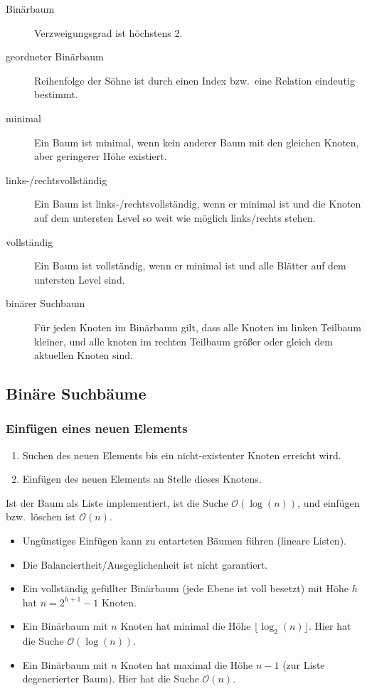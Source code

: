 \begin{description}
  \item[Binärbaum] Verzweigungsgrad ist höchstens 2.
  \item[geordneter Binärbaum] Reihenfolge der Söhne ist durch einen Index bzw.~eine Relation eindeutig bestimmt.
  \item[minimal] Ein Baum ist minimal, wenn kein anderer Baum mit den gleichen Knoten, aber geringerer Höhe existiert.
  \item[links-/rechtsvollständig] Ein Baum ist links-/rechtsvollständig, wenn er minimal ist und die Knoten auf dem untersten Level so weit wie möglich links/rechts stehen.
  \item[vollständig] Ein Baum ist vollständig, wenn er minimal ist und alle Blätter auf dem untersten Level sind.
  \item[binärer Suchbaum] Für jeden Knoten im Binärbaum gilt, dass alle Knoten im linken Teilbaum kleiner, und alle knoten im rechten Teilbaum größer oder gleich dem aktuellen Knoten sind.
\end{description}

\subsection{Binäre Suchbäume}
\subsubsection{Einfügen eines neuen Elements}
\begin{enumerate}
  \item Suchen des neuen Elements bis ein nicht-existenter Knoten erreicht wird.
  \item Einfügen des neuen Elements an Stelle dieses Knotens.
\end{enumerate}

\noindent Ist der Baum als Liste implementiert, ist die Suche $\mathcal{O}(\log(n))$, und einfügen bzw.~löschen ist $\mathcal{O}(n)$.

\begin{itemize}
  \item Ungünstiges Einfügen kann zu entarteten Bäumen führen (lineare Listen).
  \item Die Balanciertheit/Ausgeglichenheit ist nicht garantiert.
  \item Ein vollständig gefüllter Binärbaum (jede Ebene ist voll besetzt) mit Höhe $h$ hat $n = 2^{h+1}-1$ Knoten.
  \item Ein Binärbaum mit $n$ Knoten hat minimal die Höhe $\lfloor\log_2(n)\rfloor$.
        Hier hat die Suche $\mathcal{O}(\log(n))$.
  \item Ein Binärbaum mit $n$ Knoten hat maximal die Höhe $n-1$ (zur Liste degenerierter Baum).
        Hier hat die Suche $\mathcal{O}(n)$.
\end{itemize}

